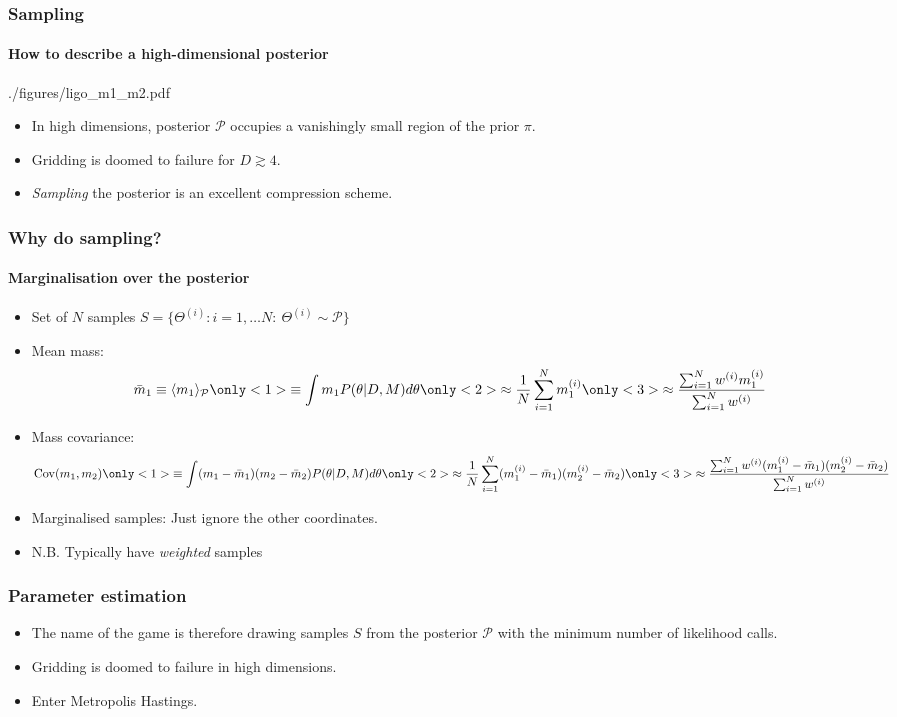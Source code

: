 \documentclass[%
]{beamer}
\newcommand{\posterior}{\mathcal{P}}
\newcommand{\prior}{\pi}
\begin{document}
\begin{frame}
    \frametitle{Sampling}
    \framesubtitle{How to describe a high-dimensional posterior}

	\begin{figright}{./figures/ligo_m1_m2.pdf}
		\begin{itemize}
          \item In high dimensions, posterior $\posterior$ occupies a vanishingly small region of the prior $\prior$.
          \item Gridding is doomed to failure for $D\gtrsim4$.
          \item {\em Sampling\/} the posterior is an excellent compression scheme.
		\end{itemize}
	\end{figright}
 
\end{frame}
%
\begin{frame}
    \frametitle{Why do sampling?}
    \framesubtitle{Marginalisation over the posterior}

    \begin{itemize}
        \item Set of $N$ samples $S = \{\Theta^{(i)}: i=1,\ldots N:\: \Theta^{(i)}\sim\mathcal{P}\}$
        \item Mean mass: \[
                \bar{m}_1 \equiv\langle m_1\rangle_\mathcal{P}
                \only<1>{\equiv \int m_1 P(\theta|D,M) d\theta }
                \only<2>{\approx \frac{1}{N}\sum_{i=1}^N m_1^{(i)}}
                \only<3>{\approx \frac{\sum_{i=1}^N w^{(i)} m_1^{(i)}}{\sum_{i=1}^N w^{(i)}}}
            \]
        \item Mass covariance: \[
                \mathrm{Cov}(m_1,m_2)
            \only<1>{\equiv \int (m_1-\bar{m}_1)(m_2-\bar{m}_2) P(\theta|D,M) d\theta }
                \only<2>{\approx \frac{1}{N}\sum_{i=1}^N (m_1^{(i)}-\bar{m}_1)(m_2^{(i)}-\bar{m}_2)}
                \only<3>{\approx \frac{\sum_{i=1}^N w^{(i)} (m_1^{(i)}-\bar{m}_1)(m_2^{(i)}-\bar{m}_2)}{\sum_{i=1}^N w^{(i)}}}
            \]
        \item Marginalised samples: Just ignore the other coordinates.
        \item N.B. Typically have {\em weighted\/} samples
    \end{itemize}
\end{frame}
%
\begin{frame}
    \frametitle{Parameter estimation}
    \begin{itemize}
        \item The name of the game is therefore drawing samples $S$ from the posterior $\mathcal{P}$ with the minimum number of likelihood calls.
        \item Gridding is doomed to failure in high dimensions.
        \item Enter Metropolis Hastings.
    \end{itemize}
\end{frame}
\end{document}
